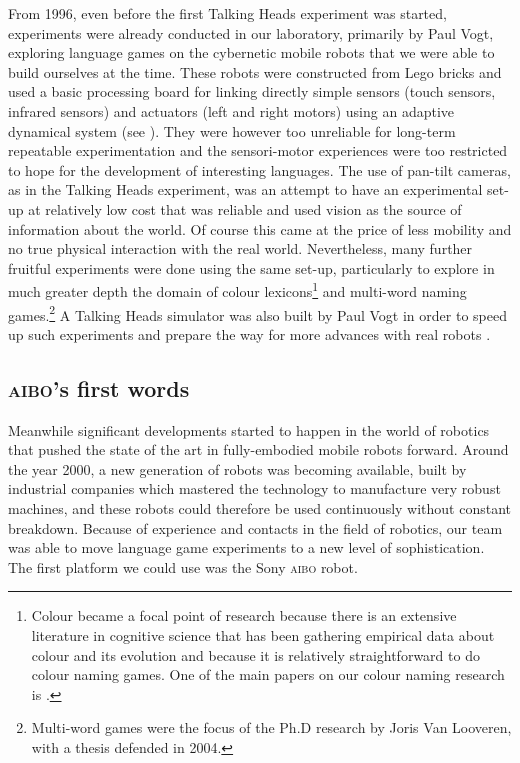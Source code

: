 From 1996, even before the first Talking Heads experiment was started, experiments were already conducted in our 
laboratory, primarily by Paul Vogt, exploring language games on the cybernetic mobile robots that we were able to build ourselves
at the time. These robots were constructed from Lego bricks and 
used a basic processing board for linking directly simple sensors (touch sensors, infrared sensors) and actuators (left and right motors)
using an adaptive dynamical system (see ). They were however too unreliable for long-term repeatable 
experimentation and the sensori-motor experiences were too restricted to hope for the development of interesting languages. The use 
of pan-tilt cameras, as in the Talking Heads experiment, was an attempt to 
have an experimental set-up at relatively low cost that was reliable and
used vision as the source of information about the world. Of course this came
at the price of less mobility and no true physical interaction with the real world. Nevertheless, many further fruitful experiments were 
done using the same set-up, particularly to explore in much greater depth the domain of colour lexicons\footnote{Colour became a focal point of research because there is an extensive literature in cognitive science that has 
been gathering empirical data about colour and its evolution and because it is relatively straightforward to do 
colour naming games. One of the main papers on our colour naming research is 
\cite{Steels:2005}.} and multi-word naming games.\footnote{Multi-word games were the focus of the Ph.D research by 
Joris Van Looveren, with a thesis defended in 2004.}
A Talking Heads simulator was also built by Paul Vogt in 
order to speed up such experiments and prepare the way for more advances with real robots \citep{Vogt:2003}.

\subsection{\textsc{aibo}'s first words}

Meanwhile significant developments started to happen in the world of robotics that pushed the state of 
the art in fully-embodied mobile robots forward.  
Around the year 2000, a new generation of robots was becoming available, built 
by industrial companies which mastered the technology to manufacture very robust machines, and these robots could therefore
be used continuously without constant breakdown. Because of experience and contacts in the field of
robotics, our team was able to move language game experiments to a new level of sophistication. The first 
platform we could use was the Sony \textsc{aibo} robot. 

